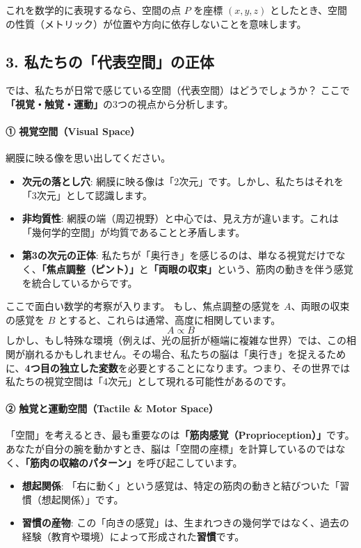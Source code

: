 \documentclass[a4paper,11pt,openany]{ltjsbook}
\begin{document}
\begin{lecturebox}
これを数学的に表現するなら、空間の点 $P$ を座標 $(x, y, z)$ としたとき、空間の性質（メトリック）が位置や方向に依存しないことを意味します。

\subsection*{3. 私たちの「代表空間」の正体}
では、私たちが日常で感じている空間（代表空間）はどうでしょうか？ ここで\textbf{「視覚・触覚・運動」}の3つの視点から分析します。

\paragraph{① 視覚空間（Visual Space）}
網膜に映る像を思い出してください。
\begin{itemize}[leftmargin=2em]
\item \textbf{次元の落とし穴}: 網膜に映る像は「2次元」です。しかし、私たちはそれを「3次元」として認識します。
\item \textbf{非均質性}: 網膜の端（周辺視野）と中心では、見え方が違います。これは「幾何学的空間」が均質であることと矛盾します。
\item \textbf{第3の次元の正体}: 私たちが「奥行き」を感じるのは、単なる視覚だけでなく、\textbf{「焦点調整（ピント）」}と\textbf{「両眼の収束」}という、筋肉の動きを伴う感覚を統合しているからです。
\end{itemize}

ここで面白い数学的考察が入ります。
もし、焦点調整の感覚を $A$、両眼の収束の感覚を $B$ とすると、これらは通常、高度に相関しています。
$$A \propto B$$
しかし、もし特殊な環境（例えば、光の屈折が極端に複雑な世界）では、この相関が崩れるかもしれません。その場合、私たちの脳は「奥行き」を捉えるために、\textbf{4つ目の独立した変数}を必要とすることになります。つまり、その世界では私たちの視覚空間は「4次元」として現れる可能性があるのです。

\paragraph{② 触覚と運動空間（Tactile \& Motor Space）}
「空間」を考えるとき、最も重要なのは\textbf{「筋肉感覚（Proprioception）」}です。
あなたが自分の腕を動かすとき、脳は「空間の座標」を計算しているのではなく、\textbf{「筋肉の収縮のパターン」}を呼び起こしています。

\begin{itemize}[leftmargin=2em]
\item \textbf{想起関係}: 「右に動く」という感覚は、特定の筋肉の動きと結びついた「習慣（想起関係）」です。
\item \textbf{習慣の産物}: この「向きの感覚」は、生まれつきの幾何学ではなく、過去の経験（教育や環境）によって形成された\textbf{習慣}です。
\end{itemize}


\end{lecturebox}
\end{document}

